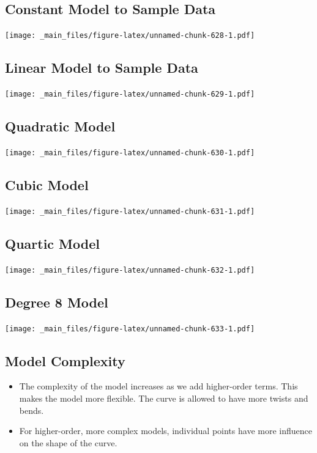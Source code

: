 \documentclass[]{book}
\begin{document}
\subsection{Constant Model to Sample
Data}\label{constant-model-to-sample-data}

\texttt{[image: \_main\_files/figure-latex/unnamed-chunk-628-1.pdf]}

\subsection{Linear Model to Sample
Data}\label{linear-model-to-sample-data-1}

\texttt{[image: \_main\_files/figure-latex/unnamed-chunk-629-1.pdf]}

\subsection{Quadratic Model}\label{quadratic-model}

\texttt{[image: \_main\_files/figure-latex/unnamed-chunk-630-1.pdf]}

\subsection{Cubic Model}\label{cubic-model-1}

\texttt{[image: \_main\_files/figure-latex/unnamed-chunk-631-1.pdf]}

\subsection{Quartic Model}\label{quartic-model}

\texttt{[image: \_main\_files/figure-latex/unnamed-chunk-632-1.pdf]}

\subsection{Degree 8 Model}\label{degree-8-model}

\texttt{[image: \_main\_files/figure-latex/unnamed-chunk-633-1.pdf]}

\subsection{Model Complexity}\label{model-complexity}

\begin{itemize}
\item
  The complexity of the model increases as we add higher-order terms.
  This makes the model more flexible. The curve is allowed to have more
  twists and bends.
\item
  For higher-order, more complex models, individual points have more
  influence on the shape of the curve.
\end{itemize}
\end{document}
